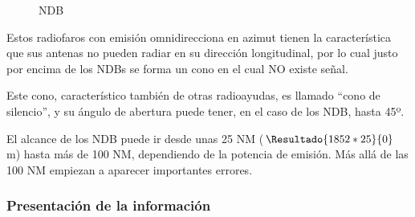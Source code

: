 \begin{figure}[!h]
  \centering
	\hspace{20pt}
  \caption{NDB}
\end{figure}


Estos radiofaros con emisi\'on omnidirecciona en azimut tienen la caracter\'istica que sus antenas no pueden radiar en su direcci\'on longitudinal, por lo cual justo por encima de los NDBs se forma un cono en el cual NO existe se\~nal.

Este cono, caracter\'istico tambi\'en de otras radioayudas, es llamado ``cono de silencio'', y su \'angulo de abertura puede tener, en el caso de los NDB, hasta 45º.

El alcance de los NDB puede ir desde unas 25 NM ($\Resultado{1852 * 25}{0}$\,m) hasta m\'as de 100 NM, dependiendo de la potencia de emisi\'on. M\'as all\'a de las 100 NM empiezan a aparecer importantes errores.


  \subsubsection{Presentaci\'on de la informaci\'on}
  \label{sec:06.adf.presentacion.informacion}

